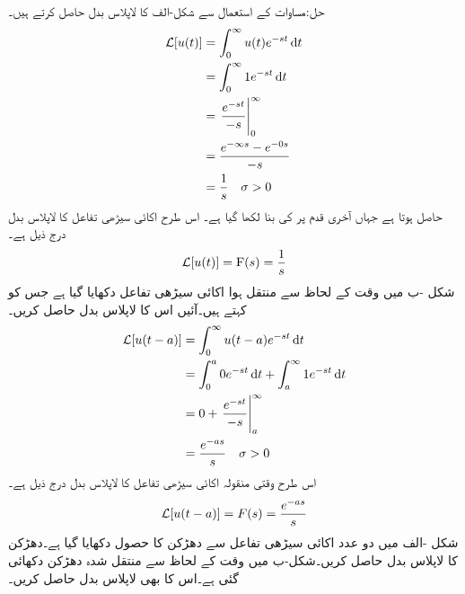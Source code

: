 حل:مساوات  کے استعمال سے شکل-الف کا لاپلاس بدل حاصل کرتے ہیں۔
\begin{align*}
\Laplace[u(t)]&=\int_0^{\infty} u(t) e^{-st}\dif t\\
&=\int_0^{\infty} 1e^{-st} \dif t\\
&=\left . \frac{e^{-st}}{-s}\right|_0^{\infty}\\
&=\frac{e^{-\infty s}-e^{-0 s}}{-s}\\
&=\frac{1}{s} \quad \sigma >0
\end{align*}
حاصل ہوتا ہے  جہاں آخری قدم پر  کی بنا  لکھا گیا ہے۔ اس طرح اکائی سیڑھی تفاعل کا لاپلاس بدل درج ذیل ہے۔
\begin{align}
\mathcal{L}[u(t)]={{\textup{F}}}(s)=\frac{1}{s}
\end{align}
شکل -ب میں  وقت کے لحاظ سے منتقل ہوا اکائی سیڑھی تفاعل دکھایا گیا ہے جس کو  کہتے ہیں۔آئیں اس کا لاپلاس بدل حاصل کریں۔
\begin{align*}
\Laplace[u(t-a)]&=\int_0^{\infty} u(t-a) e^{-st} \dif t\\
&=\int_0^a 0 e^{-st} \dif t+\int_a^{\infty} 1 e^{-st}\dif t\\
&=0+\left. \frac{e^{-st}}{-s}\right|_a^{\infty}\\
&=\frac{e^{-as}}{s} \quad \sigma >0
\end{align*} 
اس طرح وقتی منقولہ اکائی سیڑھی تفاعل کا لاپلاس بدل درج ذیل ہے۔
\begin{align}\label{مساوات_لاپلاس_منقولہ_اکائی_سیڑھی}
\mathcal{L}[u(t-a)]=F(s)=\frac{e^{-as}}{s}
\end{align}
شکل -الف میں دو عدد اکائی سیڑھی تفاعل سے دھڑکن کا حصول دکھایا گیا ہے۔دھڑکن کا لاپلاس بدل حاصل کریں۔شکل-ب میں وقت کے لحاظ سے منتقل شدہ دھڑکن دکھائی گئی ہے۔اس کا بھی لاپلاس بدل حاصل کریں۔ 
